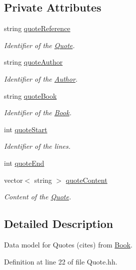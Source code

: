 \subsection*{Private Attributes}
\begin{DoxyCompactItemize}
\item 
string \hyperlink{class_quote_a9c7b2deff2ee9a0a216c360fe304202a}{quote\+Reference}
\begin{DoxyCompactList}\small\item\em Identifier of the \hyperlink{class_quote}{Quote}. \end{DoxyCompactList}\item 
string \hyperlink{class_quote_a930113c4ee0ae5e5506bbc1ea3e79b49}{quote\+Author}
\begin{DoxyCompactList}\small\item\em Identifier of the \hyperlink{class_author}{Author}. \end{DoxyCompactList}\item 
string \hyperlink{class_quote_a7e6968e086bdd45b40627a37ecbbf6fc}{quote\+Book}
\begin{DoxyCompactList}\small\item\em Identifier of the \hyperlink{class_book}{Book}. \end{DoxyCompactList}\item 
int \hyperlink{class_quote_ac426122ac24638740b2a5c5e8342e8c9}{quote\+Start}
\begin{DoxyCompactList}\small\item\em Identifier of the lines. \end{DoxyCompactList}\item 
int \hyperlink{class_quote_aa5953a477b96183c8dc2fc8a42001c29}{quote\+End}
\item 
vector$<$ string $>$ \hyperlink{class_quote_a0ffcb584920e14d7dd5c45820997f989}{quote\+Content}
\begin{DoxyCompactList}\small\item\em Content of the \hyperlink{class_quote}{Quote}. \end{DoxyCompactList}\end{DoxyCompactItemize}


\subsection{Detailed Description}
Data model for Quotes (cites) from \hyperlink{class_book}{Book}. 

Definition at line 22 of file Quote.\+hh.



